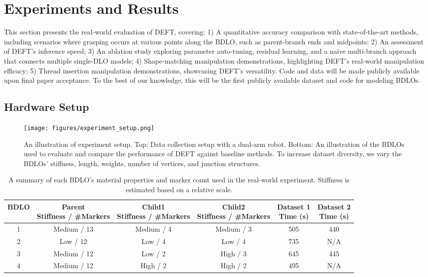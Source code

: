 \section{Experiments and Results}
\label{sec:experiments}

This section presents the real-world evaluation of DEFT, covering:
1) A quantitative accuracy comparison with state-of-the-art methods, including scenarios where grasping occurs at various points along the BDLO, such as parent-branch ends and midpoints;
2) An assessment of DEFT’s inference speed;
3) An ablation study exploring parameter auto-tuning, residual learning, and a naive multi-branch approach that connects multiple single-DLO models;
4) Shape-matching manipulation demonstrations, highlighting DEFT’s real-world manipulation efficacy;
5) Thread insertion manipulation demonstrations, showcasing DEFT’s versatility.
Code and data will be made publicly available upon final paper acceptance. 
To the best of our knowledge, this will be the first publicly available dataset and code for modeling BDLOs.

\subsection{Hardware Setup}

\begin{figure}
    \centering
    \texttt{[image: figures/experiment\_setup.png]}
    \caption{An illustration of experiment setup.
    Top: Data collection setup with a dual-arm robot. 
    Bottom: An illustration of the BDLOs used to evaluate and compare the performance of DEFT against baseline methods. 
    To increase dataset diversity, we vary the BDLOs’ stiffness, length, weights, number of vertices, and junction structures.}    
    \label{fig:experimentsetup}
\end{figure}


\begin{table*}[t]
\centering
\caption{A summary of each BDLO's material properties and marker count used in the real-world experiment. Stiffness is estimated based on a relative scale.}
\label{mat_prop}
\begin{tabular}{c|| c |c | c| c |c}
\toprule
BDLO & \makecell{Parent\\ Stiffness / \#Markers} & \makecell{Child1\\ 
Stiffness / \#Markers} & \makecell{Child2\\ Stiffness / \#Markers} & \makecell{Dataset 1 \\ Time (s)} & \makecell{Dataset 2 \\ Time (s)} \\
\hline 

1 & Medium / 13 & Medium / 4 & Medium / 3 & 505 & 440 \\
2 & Low / 12    & Low / 4    & Low / 4    & 735  & N/A\\
3 & Medium / 12 & Low / 2    & High / 3   & 645 & 445\\
4 & Medium / 12 & High / 2   & High / 2   & 495 & N/A \\
\bottomrule
\end{tabular}
\end{table*}

